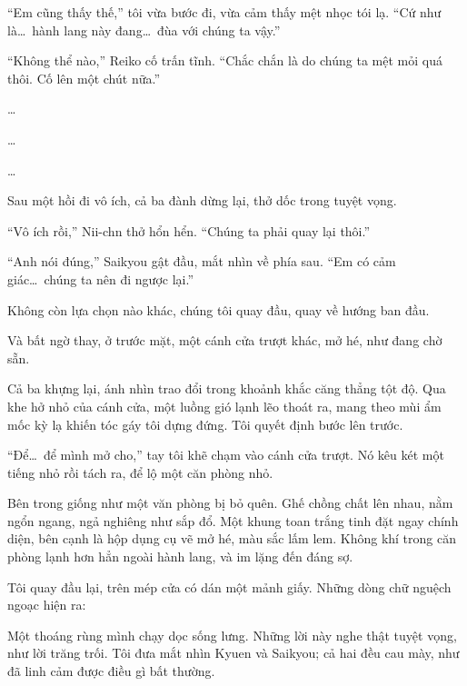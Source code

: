 \documentclass[../main.tex]{subfiles}
\begin{document}
``Em cũng thấy thế,'' tôi vừa bước đi, vừa cảm thấy mệt nhọc tói lạ. ``Cứ như là\dots\ hành lang này đang\dots\ đùa với chúng ta vậy.''

``Không thể nào,'' Reiko cố trấn tĩnh. ``Chắc chắn là do chúng ta mệt mỏi quá thôi. Cố lên một chút nữa.''

\dots

\dots

\dots

Sau một hồi đi vô ích, cả ba đành dừng lại, thở dốc trong tuyệt vọng.

``Vô ích rồi,'' Nii-chn thở hổn hển. ``Chúng ta phải quay lại thôi.''

``Anh nói đúng,'' Saikyou gật đầu, mắt nhìn về phía sau. ``Em có cảm giác\dots\ chúng ta nên đi ngược lại.''

Không còn lựa chọn nào khác, chúng tôi quay đầu, quay về hướng ban đầu.

Và bất ngờ thay, ở trước mặt, một cánh cửa trượt khác, mở hé, như đang chờ sẵn.


Cả ba khựng lại, ánh nhìn trao đổi trong khoảnh khắc căng thẳng tột độ. Qua khe hở nhỏ của cánh cửa, một luồng gió lạnh lẽo thoát ra, mang theo mùi ẩm mốc kỳ lạ khiến tóc gáy tôi dựng đứng. Tôi quyết định bước lên trước.

``Để\dots\ để mình mở cho,'' tay tôi khẽ chạm vào cánh cửa trượt. Nó kêu két một tiếng nhỏ rồi tách ra, để lộ một căn phòng nhỏ.

Bên trong giống như một văn phòng bị bỏ quên. Ghế chồng chất lên nhau, nằm ngổn ngang, ngả nghiêng như sắp đổ. Một khung toan trắng tinh đặt ngay chính diện, bên cạnh là hộp dụng cụ vẽ mở hé, màu sắc lấm lem. Không khí trong căn phòng lạnh hơn hẳn ngoài hành lang, và im lặng đến đáng sợ.

Tôi quay đầu lại, trên mép cửa có dán một mảnh giấy. Những dòng chữ nguệch ngoạc hiện ra:


Một thoáng rùng mình chạy dọc sống lưng. Những lời này nghe thật tuyệt vọng, như lời trăng trối. Tôi đưa mắt nhìn Kyuen và Saikyou; cả hai đều cau mày, như đã linh cảm được điều gì bất thường.
\end{document}

